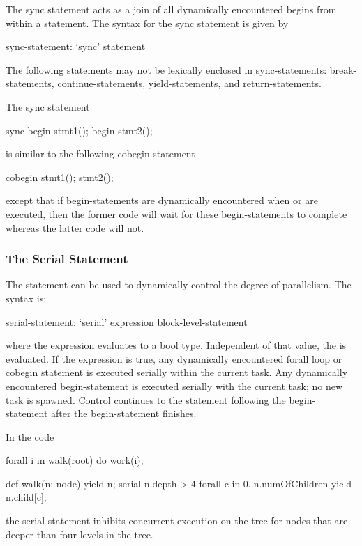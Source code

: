 The sync statement acts as a join of all dynamically encountered
begins from within a statement.  The syntax for the sync statement is
given by
\begin{syntax}
sync-statement:
  `sync' statement
\end{syntax}

The following statements may not be lexically enclosed in
sync-statements: break-statements, continue-statements,
yield-statements, and return-statements.

\begin{example}
The sync statement
\begin{chapel}
sync {
  begin stmt1();
  begin stmt2();
}
\end{chapel}
is similar to the following cobegin statement
\begin{chapel}
cobegin {
  stmt1();
  stmt2();
}
\end{chapel}
except that if begin-statements are dynamically encountered
when  or  are executed, then the former
code will wait for these begin-statements to complete whereas the
latter code will not.
\end{example}

\subsubsection{The Serial Statement}
\label{Serial}

The  statement can be used to dynamically control the
degree of parallelism.  The syntax is:
\begin{syntax}
serial-statement:
  `serial' expression block-level-statement
\end{syntax}
where the expression evaluates to a bool type.  Independent of that
value, the  is evaluated. If the
expression is true, any dynamically encountered forall loop or cobegin
statement is executed serially within the current task.  Any
dynamically encountered begin-statement is executed serially with the
current task; no new task is spawned.  Control continues to the
statement following the begin-statement after the begin-statement
finishes.

\begin{example}
In the code
\begin{chapel}
forall i in walk(root) do
  work(i);

def walk(n: node) {
  yield n;
  serial n.depth > 4 forall c in 0..n.numOfChildren {
      yield n.child[c];
  }
}
\end{chapel}
the serial statement inhibits concurrent execution on the tree for
nodes that are deeper than four levels in the tree.
\end{example}

